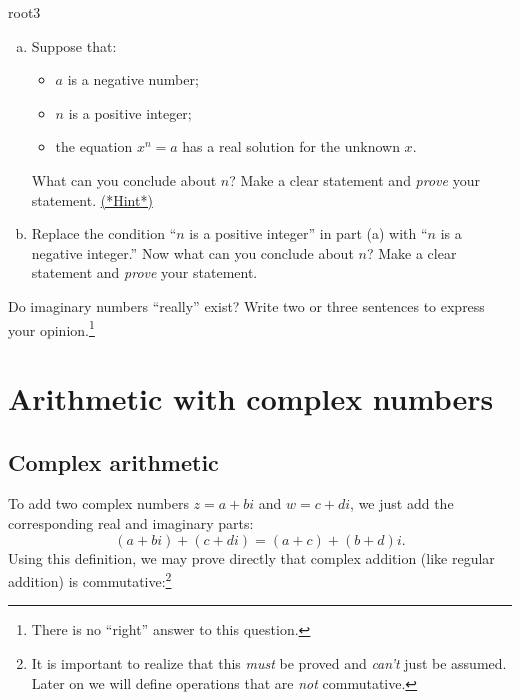 \begin{exercise}{root3}
\begin{enumerate}[(a)]
\item
Suppose that:
\begin{itemize}
\item
$a$ is a negative number;
\item
$n$ is a positive integer;
\item
the equation $x^n = a$ has a real solution for the unknown $x$.
\end{itemize}
What can you conclude about $n$? Make a clear statement and \emph{prove} your statement.
\hyperref[sec:complex:hints]{(*Hint*)}

\item
Replace the condition ``$n$ is a positive integer'' in part (a) with ``$n$ is a negative integer.'' Now what can you conclude about $n$? Make a clear statement and \emph{prove} your statement.
\end{enumerate}
\end{exercise}


\begin{exercise}{7} Do imaginary numbers ``really'' exist? Write
two or three sentences to express your opinion.\footnote{There is no ``right'' answer to this question.}
\end{exercise}


\section{Arithmetic with complex numbers\quad 
{}}
\label{sec:ComplexNumbers:Arithmetic}

\subsection{Complex arithmetic}

To add two complex numbers $z=a+bi$ and $w=c+di$, we just add the
corresponding real and imaginary parts: 
\[(a+bi)+(c+di)=(a+c)+(b+d)i.\]
Using this definition, we may prove directly that complex addition (like regular addition) is commutative:\footnote{It is important to realize that this \emph{must} be proved and \emph{can't} just be assumed.  Later on we will define operations that are \emph{not} commutative.}

